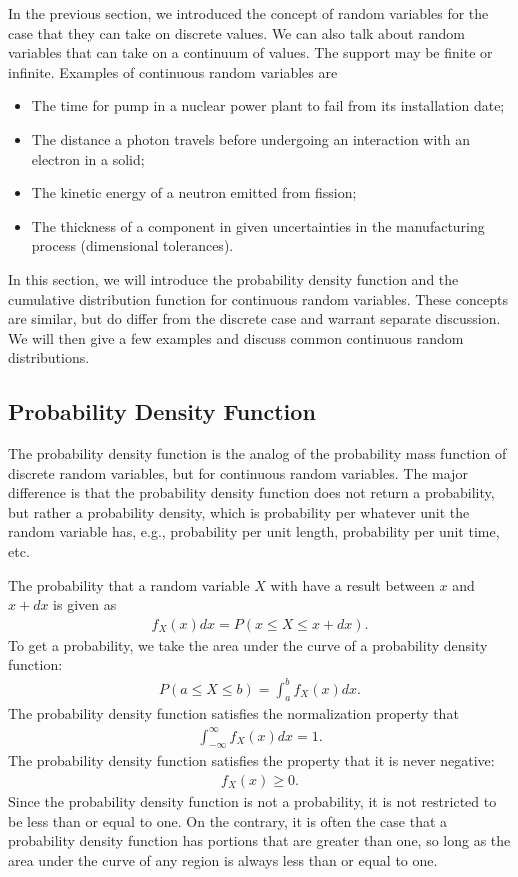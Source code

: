 In the previous section, we introduced the concept of random variables for the case that they can take on discrete values. We can also talk about random variables that can take on a continuum of values. The support may be finite or infinite. Examples of continuous random variables are
\begin{itemize}
  \item The time for pump in a nuclear power plant to fail from its installation date;
  \item The distance a photon travels before undergoing an interaction with an electron in a solid;
  \item The kinetic energy of a neutron emitted from fission;
  \item The thickness of a component in given uncertainties in the manufacturing process (dimensional tolerances).
\end{itemize}

In this section, we will introduce the probability density function and the cumulative distribution function for continuous random variables. These concepts are similar, but do differ from the discrete case and warrant separate discussion. We will then give a few examples and discuss common continuous random distributions.

\subsection{Probability Density Function}

The probability density function is the analog of the probability mass function of discrete random variables, but for continuous random variables. The major difference is that the probability density function does not return a probability, but rather a probability density, which is probability per whatever unit the random variable has, e.g., probability per unit length, probability per unit time, etc.

The probability that a random variable $X$ with have a result between $x$ and $x + dx$ is given as
\begin{align}
  f_X(x) dx = P( x \le X \le x + dx ) .
\end{align}
To get a probability, we take the area under the curve of a probability density function:
\begin{align}
  P( a \le X \le b ) = \int_a^b f_X(x) dx .
\end{align}
The probability density function satisfies the normalization property that
\begin{align}
  \int_{-\infty}^\infty f_X(x) dx = 1.
\end{align}
The probability density function satisfies the property that it is never negative:
\begin{align}
  f_X(x) \ge 0.
\end{align}
Since the probability density function is not a probability, it is not restricted to be less than or equal to one. On the contrary, it is often the case that a probability density function has portions that are greater than one, so long as the area under the curve of any region is always less than or equal to one. 

